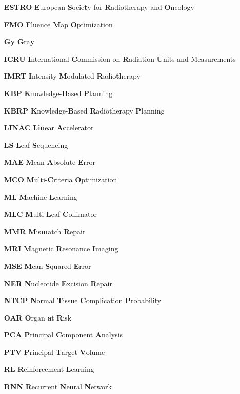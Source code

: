 \begin{itemize}
	\item[\textbf{ESTRO}] \textbf{E}uropean \textbf{S}ocie\textbf{t}y for \textbf{R}adiotherapy and \textbf{O}ncology
	\item[\textbf{FMO}] \textbf{F}luence \textbf{M}ap \textbf{O}ptimization
	\item[\textbf{Gy}] \textbf{G}ra\textbf{y}
	\item[\textbf{ICRU}] \textbf{I}nternational \textbf{C}ommission on \textbf{R}adiation \textbf{U}nits and Measurements
	\item[\textbf{IMRT}] \textbf{I}ntensity \textbf{M}odulated \textbf{R}adio\textbf{t}herapy
	\item[\textbf{KBP}] \textbf{K}nowledge-\textbf{B}ased \textbf{P}lanning
	\item[\textbf{KBRP}] \textbf{K}nowledge-\textbf{B}ased \textbf{R}adiotherapy \textbf{P}lanning
	\item[\textbf{LINAC}] \textbf{Lin}ear \textbf{Ac}celerator
	\item[\textbf{LS}] \textbf{L}eaf \textbf{S}equencing
	\item[\textbf{MAE}] \textbf{M}ean \textbf{A}bsolute \textbf{E}rror
	\item[\textbf{MCO}] \textbf{M}ulti-\textbf{C}riteria \textbf{O}ptimization
	\item[\textbf{ML}] \textbf{M}achine \textbf{L}earning
	\item[\textbf{MLC}] \textbf{M}ulti-\textbf{L}eaf \textbf{C}ollimator
	\item[\textbf{MMR}] \textbf{M}is\textbf{m}atch \textbf{R}epair
	\item[\textbf{MRI}] \textbf{M}agnetic \textbf{R}esonance \textbf{I}maging
	\item[\textbf{MSE}] \textbf{M}ean \textbf{S}quared \textbf{E}rror
	\item[\textbf{NER}] \textbf{N}ucleotide \textbf{E}xcision \textbf{R}epair
	\item[\textbf{NTCP}] \textbf{N}ormal \textbf{T}issue \textbf{C}omplication \textbf{P}robability
	\item[\textbf{OAR}] \textbf{O}rgan \textbf{a}t \textbf{R}isk
	\item[\textbf{PCA}] \textbf{P}rincipal \textbf{C}omponent \textbf{A}nalysis
	\item[\textbf{PTV}] \textbf{P}rincipal \textbf{T}arget \textbf{V}olume
	\item[\textbf{RL}] \textbf{R}einforcement \textbf{L}earning
	\item[\textbf{RNN}] \textbf{R}ecurrent \textbf{N}eural \textbf{N}etwork

\end{itemize}
